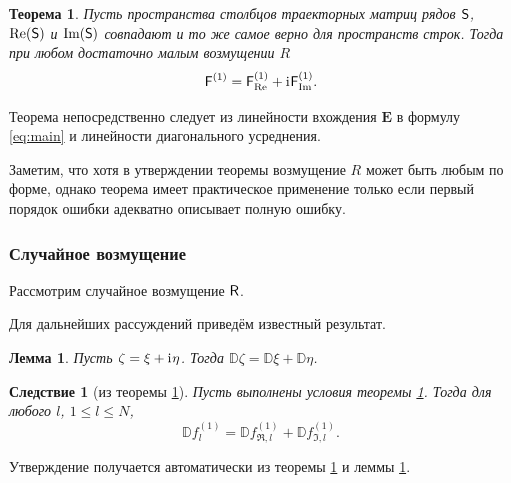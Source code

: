 \documentclass[12pt,a4paper]{article}
\newtheorem{corollary}{Следствие}%
\newtheorem{theorem}{Теорема}%
\newtheorem{lemma}{Лемма}%
\begin{document}
\begin{theorem}\label{th:sum}
Пусть пространства столбцов траекторных матриц рядов $\textsf{S}$, $\Re(\textsf{S})$ и $\Im(\textsf{S})$ совпадают и то же самое верно для пространств строк.
Тогда при любом достаточно малым возмущении $R$ $$\textsf{F}^{(1)} = \textsf{F}^{(1)}_{\Re} + \mathrm{i}\mkern1mu\textsf{F}^{(1)}_{\Im}.$$
\end{theorem}

Теорема непосредственно следует из линейности вхождения $\mathbf{E}$ в формулу \eqref{eq:main} и линейности диагонального усреднения.

Заметим, что хотя в утверждении теоремы возмущение $R$ может быть любым по форме, однако теорема имеет практическое применение только если первый порядок ошибки адекватно описывает полную ошибку.

\subsubsection{Случайное возмущение}

Рассмотрим случайное возмущение $\textsf{R}$.

Для дальнейших рассуждений приведём известный результат.
\begin{lemma} \label{std:disp}
Пусть $\zeta = \xi + \mathrm{i}\mkern1mu\eta$. Тогда $\mathbb{D}\zeta = \mathbb{D}\xi + \mathbb{D}\eta$.
\end{lemma}

\begin{corollary}[из теоремы {\ref{th:sum}}] \label{st:dispsum}
	Пусть выполнены условия теоремы \ref{th:sum}.
	Тогда для любого $l$, $1\le l \le N$,
	\begin{equation} \label{eq:dispsum}
		\mathbb{D}f^{(1)}_l = \mathbb{D}f^{(1)}_{\Re, l} + \mathbb{D}f^{(1)}_{\Im, l}.	
	\end{equation}
\end{corollary}

Утверждение получается автоматически из теоремы \ref{th:sum} и леммы \ref{std:disp}.
\end{document}
